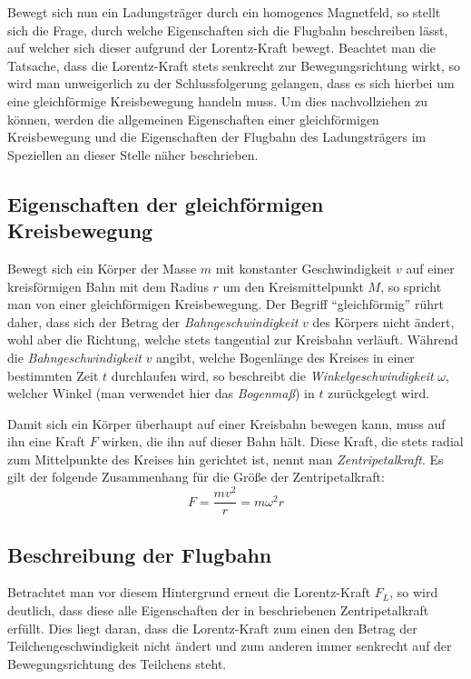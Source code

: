 Bewegt sich nun ein Ladungstr\"ager durch ein homogenes Magnetfeld, so stellt sich die Frage, durch welche Eigenschaften sich
die Flugbahn beschreiben l\"asst, auf welcher sich dieser aufgrund der Lorentz-Kraft bewegt. Beachtet man die Tatsache, dass die
Lorentz-Kraft stets senkrecht zur Bewegungsrichtung wirkt, so wird man unweigerlich zu der Schlussfolgerung gelangen, dass es sich
hierbei um eine gleichf\"ormige Kreisbewegung handeln muss. Um dies nachvollziehen zu k\"onnen, werden die allgemeinen Eigenschaften
einer gleichf\"ormigen Kreisbewegung und die Eigenschaften der Flugbahn des Ladungstr\"agers im Speziellen an dieser Stelle n\"aher
beschrieben.

\subsection{Eigenschaften der gleichf\"ormigen Kreisbewegung}
\label{sec:kreisbewegung}

Bewegt sich ein K\"orper der Masse \(m\) mit konstanter Geschwindigkeit \(v\) auf einer kreisf\"ormigen Bahn mit dem Radius \(r\) um den
Kreismittelpunkt \(M\), so spricht man von einer gleichf\"ormigen Kreisbewegung. Der Begriff "`gleichf\"ormig"' r\"uhrt daher,
dass sich der Betrag der \textit{Bahngeschwindigkeit} \(v\) des K\"orpers nicht \"andert, wohl aber die Richtung, welche stets
tangential zur Kreisbahn verl\"auft. W\"ahrend die \textit{Bahngeschwindigkeit} \(v\) angibt, welche Bogenl\"ange des Kreises in einer
bestimmten Zeit \(t\) durchlaufen wird, so beschreibt die \textit{Winkelgeschwindigkeit} \(\omega\), welcher Winkel (man verwendet hier
das \textit{Bogenma{\ss}}) in \(t\) zur\"uckgelegt wird.

Damit sich ein K\"orper \"uberhaupt auf einer Kreisbahn bewegen kann, muss auf ihn eine Kraft \(F\) wirken, die ihn auf dieser Bahn
h\"alt. Diese Kraft, die stets radial zum Mittelpunkte des Kreises hin gerichtet ist, nennt man \textit{Zentripetalkraft}.
Es gilt der folgende Zusammenhang f\"ur die Gr\"o{\ss}e der Zentripetalkraft:
\begin{equation}
\label{eq:zentripetalkraft}
F = \frac{mv^2}{r} = m\omega^2r
\end{equation}

\subsection{Beschreibung der Flugbahn}
\label{sec:flugbahnbeschreibung}

Betrachtet man vor diesem Hintergrund erneut die Lorentz-Kraft \(F_L\), so wird deutlich, dass diese alle Eigenschaften der in
 beschriebenen Zentripetalkraft erf\"ullt. Dies liegt daran, dass die Lorentz-Kraft zum einen den Betrag
der Teilchengeschwindigkeit nicht \"andert und zum anderen immer senkrecht auf der Bewegungsrichtung des Teilchens steht.

